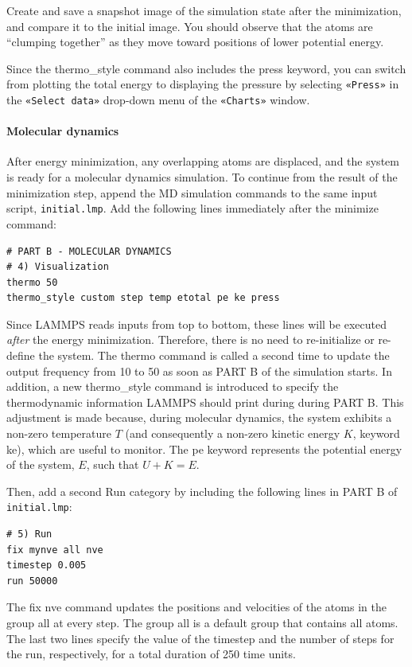 \documentclass[9pt,tutorial]{livecoms}
\newcommand{\lmpcmd}[1]{\hspace{0pt}\colorbox{listing}{\textcolor{command}{\small{#1}}}\hspace{0pt}} %
\newcommand{\flecmd}[1]{\textcolor{command}{\texttt{#1}}} %
\newcommand{\guicmd}[1]{\textcolor{command}{\texttt{«#1»}}} %
\begin{document}
Create and save a snapshot image of the simulation state after the
minimization, and compare it to the initial image.  You should observe
that the atoms are ``clumping together'' as they move toward positions
of lower potential energy.

\begin{note}
Since the \lmpcmd{thermo\_style} command also includes the \lmpcmd{press}
keyword, you can switch from plotting the total energy to
displaying the pressure by selecting \guicmd{Press} in the \guicmd{Select data}
drop-down menu of the \guicmd{Charts} window.
\end{note}

\paragraph{Molecular dynamics}

After energy minimization, any overlapping atoms are displaced, and
the system is ready for a molecular dynamics simulation.  To continue
from the result of the minimization step, append the MD simulation
commands to the same input script, \flecmd{initial.lmp}.  Add the
following lines immediately after the \lmpcmd{minimize} command:
\begin{lstlisting}
# PART B - MOLECULAR DYNAMICS
# 4) Visualization
thermo 50
thermo_style custom step temp etotal pe ke press
\end{lstlisting}

Since LAMMPS reads inputs from top to bottom, these lines will
be executed \emph{after} the energy minimization.  Therefore,
there is no need to re-initialize or re-define the
system.  The \lmpcmd{thermo} command is called a second time to
update the output frequency from 10 to 50 as soon as \lmpcmd{PART B} of
the simulation starts.  In addition, a new \lmpcmd{thermo\_style}
command is introduced to specify the thermodynamic information LAMMPS should
print during during \lmpcmd{PART B}.  This adjustment is made because, during
molecular dynamics, the system exhibits a non-zero temperature $T$ (and
consequently a non-zero kinetic energy $K$, keyword \lmpcmd{ke}), which are useful to monitor.
The \lmpcmd{pe} keyword represents the potential energy of the system, $E$, such that
$U + K = E$.

Then, add a second \lmpcmd{Run} category by including the following
lines in \lmpcmd{PART B} of \flecmd{initial.lmp}:
\begin{lstlisting}
# 5) Run
fix mynve all nve
timestep 0.005
run 50000
\end{lstlisting}
The \lmpcmd{fix nve} command updates the positions and velocities of the
atoms in the group \lmpcmd{all} at every step.  The group \lmpcmd{all}
is a default group that contains all atoms.  The last two lines specify
the value of the \lmpcmd{timestep} and the number of steps for the
\lmpcmd{run}, respectively, for a total duration of 250 time units.
\end{document}
